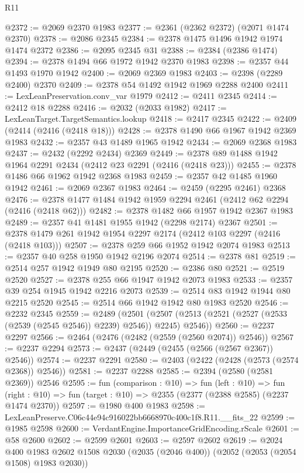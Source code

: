 \begin{lexlean}{R11}
\begin{coremodule}
@2372 := @2069 @2370 @1983
@2377 := @2361 (@2362 @2372) (@2071 @1474 @2370)
@2378 := @2086 @2345
@2384 := @2378 @1475 @1496 @1942 @1974 @1474 @2372
@2386 := @2095 @2345 @31
@2388 := @2384 (@2386 @1474)
@2394 := @2378 @1494 @66 @1972 @1942 @2370 @1983
@2398 := @2357 @44 @1493 @1970 @1942
@2400 := @2069 @2369 @1983
@2403 := @2398 (@2289 @2400) @2370
@2409 := @2378 @54 @1492 @1942 @1969 @2288 @2400
@2411 := LexLeanPreservation.conv_var @1979
@2412 := @2411 @2345
@2414 := @2412 @18 @2288
@2416 := @2032 (@2033 @1982)
@2417 := LexLeanTarget.TargetSemantics.lookup
@2418 := @2417 @2345
@2422 := @2409 (@2414 (@2416 (@2418 @18)))
@2428 := @2378 @1490 @66 @1967 @1942 @2369 @1983
@2432 := @2357 @43 @1489 @1965 @1942
@2434 := @2069 @2368 @1983
@2437 := @2432 (@2292 @2434) @2369
@2449 := @2378 @89 @1488 @1942 @1964 @2291 @2434 (@2412 @23 @2291 (@2416 (@2418 @23)))
@2455 := @2378 @1486 @66 @1962 @1942 @2368 @1983
@2459 := @2357 @42 @1485 @1960 @1942
@2461 := @2069 @2367 @1983
@2464 := @2459 (@2295 @2461) @2368
@2476 := @2378 @1477 @1484 @1942 @1959 @2294 @2461 (@2412 @62 @2294 (@2416 (@2418 @62)))
@2482 := @2378 @1482 @66 @1957 @1942 @2367 @1983
@2489 := @2357 @41 @1481 @1955 @1942 (@2298 @2174) @2367
@2501 := @2378 @1479 @261 @1942 @1954 @2297 @2174 (@2412 @103 @2297 (@2416 (@2418 @103)))
@2507 := @2378 @259 @66 @1952 @1942 @2074 @1983
@2513 := @2357 @40 @258 @1950 @1942 @2196 @2074
@2514 := @2378 @81
@2519 := @2514 @257 @1942 @1949 @80 @2195
@2520 := @2386 @80
@2521 := @2519 @2520
@2527 := @2378 @255 @66 @1947 @1942 @2073 @1983
@2533 := @2357 @39 @254 @1945 @1942 @2216 @2073
@2539 := @2514 @83 @1942 @1944 @80 @2215 @2520
@2545 := @2514 @66 @1942 @1942 @80 @1983 @2520
@2546 := @2232 @2345
@2559 := @2489
    (@2501 (@2507 (@2513 (@2521 (@2527 (@2533 (@2539 (@2545 @2546)) @2239) @2546)) @2245) @2546))
@2560 := @2237 @2297
@2566 := @2464 (@2476 (@2482 (@2559 (@2560 @2074)) @2546))
@2567 := @2237 @2294
@2573 := @2437 (@2449 (@2455 (@2566 (@2567 @2367)) @2546))
@2574 := @2237 @2291
@2580 := @2403 (@2422 (@2428 (@2573 (@2574 @2368)) @2546))
@2581 := @2237 @2288
@2585 := @2394 (@2580 (@2581 @2369)) @2546
@2595 := fun (comparison : @10) =>
  fun (left : @10) =>
  fun (right : @10) => fun (target : @10) => @2355 (@2377 (@2388 @2585) (@2237 @1474 @2370))
@2597 := @1980 @400 @1983
@2598 := LexLeanPreserve.C06c44e94c916022bb6668970c400c1f8.R11.__fits_22
@2599 := @1985 @2598
@2600 := VerdantEngine.ImportanceGridEncoding.rScale
@2601 := @58 @2600
@2602 := @2599 @2601
@2603 := @2597 @2602
@2619 := @2024
    @400
    @1983
    @2602
    @1508
    @2030
    (@2035 (@2046 @400))
    (@2052 (@2053 (@2054 @1508) @1983 @2030))

\end{coremodule}
\end{lexlean}
